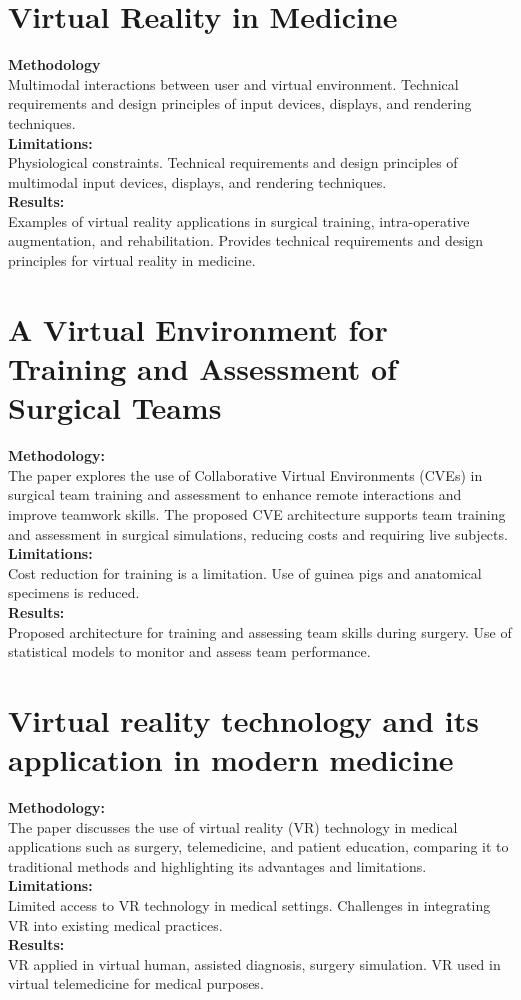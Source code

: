 \section{Virtual Reality in Medicine\cite{JournalArticle}\cite{JournalArticle11}}
\textbf{Methodology}\\Multimodal interactions between user and virtual environment.
Technical requirements and design principles of input devices, displays, and rendering techniques.\\
\textbf{Limitations:}\\Physiological constraints. Technical requirements and design principles of multimodal input devices, displays, and rendering techniques.\\
\textbf{Results:}\\ Examples of virtual reality applications in surgical training, intra-operative augmentation, and rehabilitation. Provides technical requirements and design principles for virtual reality in medicine.
\section{A Virtual Environment for Training and Assessment of Surgical Teams\cite{papagiannakis2018virtual}}
\textbf{Methodology:}\\The paper explores the use of Collaborative Virtual Environments (CVEs) in surgical team training and assessment to enhance remote interactions and improve teamwork skills. The proposed CVE architecture supports team training and assessment in surgical simulations, reducing costs and requiring live subjects.\\
\textbf{Limitations:}\\Cost reduction for training is a limitation.
Use of guinea pigs and anatomical specimens is reduced.\\
\textbf{Results:}\\Proposed architecture for training and assessing team skills during surgery. Use of statistical models to monitor and assess team performance.
\section{Virtual reality technology and its application in modern medicine
\cite{JournalArticle}}
\textbf{Methodology:}\\The paper discusses the use of virtual reality (VR) technology in medical applications such as surgery, telemedicine, and patient education, comparing it to traditional methods and highlighting its advantages and limitations.\\
\textbf{Limitations:}\\Limited access to VR technology in medical settings. Challenges in integrating VR into existing medical practices.\\
\textbf{Results:}\\ VR applied in virtual human, assisted diagnosis, surgery simulation. VR used in virtual telemedicine for medical purposes.
